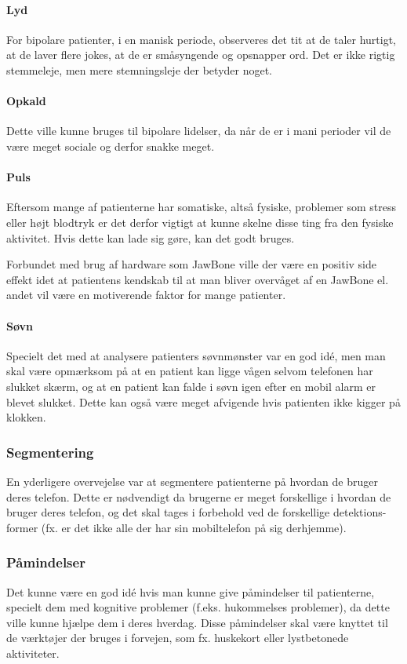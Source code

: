 \paragraph{Lyd}
For bipolare patienter, i en manisk periode, observeres det tit at de taler hurtigt, at de laver flere jokes, at de er småsyngende og opsnapper ord. Det er ikke rigtig stemmeleje, men mere stemningsleje der betyder noget.

\paragraph{Opkald}
Dette ville kunne bruges til bipolare lidelser, da når de er i mani perioder vil de være meget sociale og derfor snakke meget. 

\paragraph{Puls}
Eftersom mange af patienterne har somatiske, altså fysiske, problemer som stress eller højt blodtryk er det derfor vigtigt at kunne skelne disse ting fra den fysiske aktivitet.
Hvis dette kan lade sig gøre, kan det godt bruges. 

Forbundet med brug af hardware som JawBone ville der være en positiv side effekt idet at patientens kendskab til at man bliver overvåget af en JawBone el. andet vil være en motiverende faktor for mange patienter.

\paragraph{Søvn}
Specielt det med at analysere patienters søvnmønster var en god idé, men man skal være opmærksom på at en patient kan ligge vågen selvom telefonen har slukket skærm, og at en patient kan falde i søvn igen efter en mobil alarm er blevet slukket.
Dette kan også være meget afvigende hvis patienten ikke kigger på klokken.

\subsubsection{Segmentering}
En yderligere overvejelse var at segmentere patienterne på hvordan de bruger deres telefon.
Dette er nødvendigt da brugerne er meget forskellige i hvordan de bruger deres telefon, og det skal tages i forbehold ved de forskellige detektions-former (fx. er det ikke alle der har sin mobiltelefon på sig derhjemme).

\subsubsection{Påmindelser}
Det kunne være en god idé hvis man kunne give påmindelser til patienterne, specielt dem med kognitive problemer (f.eks. hukommelses problemer), da dette ville kunne hjælpe dem i deres hverdag.
Disse påmindelser skal være knyttet til de værktøjer der bruges i forvejen, som fx. huskekort eller lystbetonede aktiviteter.

